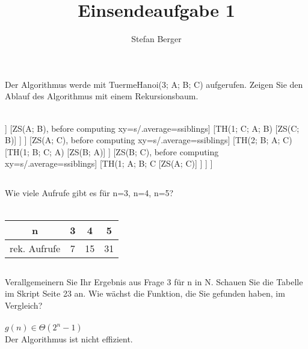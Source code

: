 \documentclass{article}
\begin{document}
\title{\Large Einsendeaufgabe 1}
\author{\normalsize Stefan Berger}
\date{}
\maketitle

\subsection{}
Der Algorithmus werde mit TuermeHanoi(3; A; B; C) aufgerufen. Zeigen Sie den Ablauf des
Algorithmus mit einem Rekursionsbaum.\\\\

\begin{forest}
[TH(3; A; B; C)
	[TH(2; A; C; B) 
		[TH(1; A; B; C)
			[ZS(A; C)]
		]
		[ZS(A; B), before computing xy={s/.average={s}{siblings}}]
		[TH(1; C; A; B)
			[ZS(C; B)]
		]
	] 
	[ZS(A; C), before computing xy={s/.average={s}{siblings}}]
	[TH(2; B; A; C)
		[TH(1; B; C; A)
			[ZS(B; A)]
		]
		[ZS(B; C), before computing xy={s/.average={s}{siblings}}]
		[TH(1; A; B; C
			[ZS(A; C)]
		]
	]
]
\end{forest}

\subsection{}
Wie viele Aufrufe gibt es für n=3, n=4, n=5? \\\\
\begin{tabular}{|c|c|c|c|}
\hline
n & 3 & 4 & 5 \\
\hline
rek. Aufrufe & 7 & 15 & 31 \\
\hline
\end{tabular}

\subsection{}
Verallgemeinern Sie Ihr Ergebnis aus Frage 3 für n in N. Schauen Sie die Tabelle im Skript Seite
23 an. Wie wächst die Funktion, die Sie gefunden haben, im Vergleich? \\\\
\begin{math}
g(n) \in \Theta(2^n - 1)
\end{math}
\\
Der Algorithmus ist nicht effizient.
\end{document}
